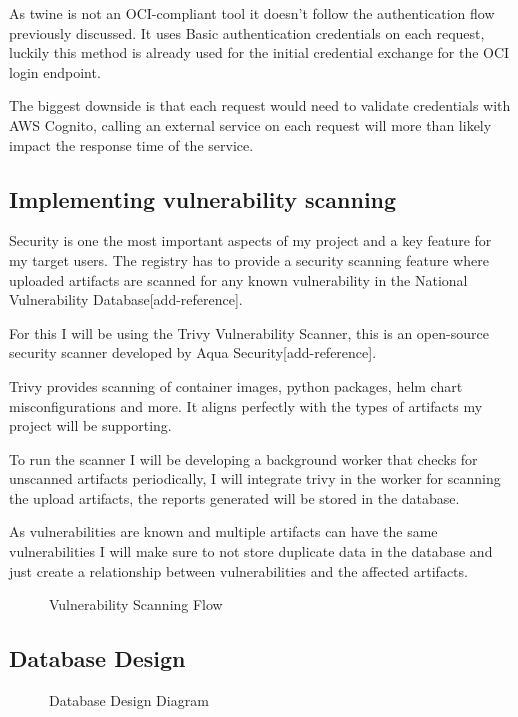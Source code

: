 \documentclass{article}
\newcommand{\widefig}[3][1.2\textwidth]{%
  \begin{figure}[H]
    \makebox[\textwidth][c]{%
      \texttt{[image: \#2]}%
    }
    \caption{#3}
  \end{figure}
}
\begin{document}
  As twine is not an OCI-compliant tool it doesn't follow the authentication flow previously discussed. It uses Basic authentication credentials on each request, luckily this method is already used for the initial credential exchange for the OCI login endpoint.

  The biggest downside is that each request would need to validate credentials with AWS Cognito, calling an external service on each request will more than likely impact the 
  response time of the service.

  \subsection{Implementing vulnerability scanning}

  Security is one the most important aspects of my project and a key feature for my target users. The registry has to provide a security scanning feature where uploaded artifacts are scanned for any known vulnerability in the National Vulnerability Database[add-reference].

  For this I will be using the Trivy Vulnerability Scanner, this is an open-source security scanner developed by Aqua Security[add-reference].

  Trivy provides scanning of container images, python packages, helm chart misconfigurations and more. It aligns perfectly with the types of artifacts my project will be supporting.

  To run the scanner I will be developing a background worker that checks for unscanned artifacts periodically, I will integrate trivy in the worker for scanning the upload artifacts, the reports generated will be stored in the database.

  As vulnerabilities are known and multiple artifacts can have the same vulnerabilities I will make sure to not store duplicate data in the database and just create a relationship between vulnerabilities and the affected artifacts.

  \widefig[1.1\textwidth]{appendix/trivy-scanning.png}{Vulnerability Scanning Flow}

  \subsection{Database Design}
  \widefig{db.png}{Database Design Diagram}
\end{document}
